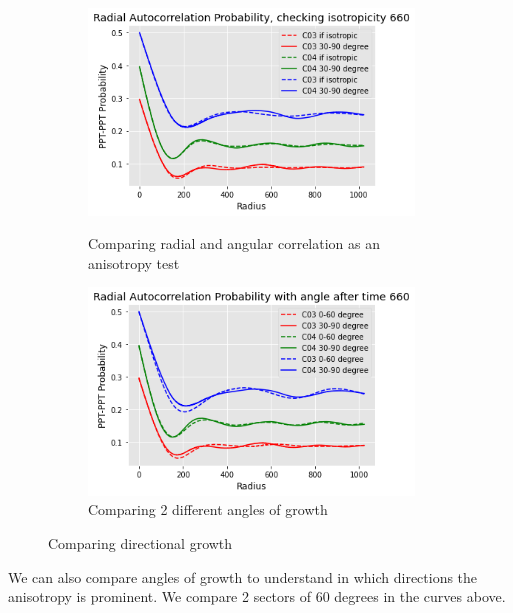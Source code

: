 \documentclass[12pt, a4paper]{report}
\begin{document}
\begin{figure}[H]
\centering
\begin{subfigure}{.49\textwidth}
  \centering
  \includegraphics[width=0.95\textwidth]{Pictures/MSFeatures/ShowingAnisotropyAngle.png}
  \label{img:microstrImg}
  \caption{Comparing radial and angular correlation as an anisotropy test}
\end{subfigure}
\begin{subfigure}{.49\textwidth}
  \centering
  \includegraphics[width=0.95\textwidth]{Pictures/MSFeatures/RadialCorr306090Comparison.png}
  \caption{Comparing 2 different angles of growth}
  \label{img:microstrImg}
\end{subfigure}

\caption{Comparing directional growth}
\label{fig:test}
\end{figure}

We can also compare angles of growth to understand in which directions the anisotropy is prominent. We compare 2 sectors of 60 degrees in the curves above.
\end{document}
